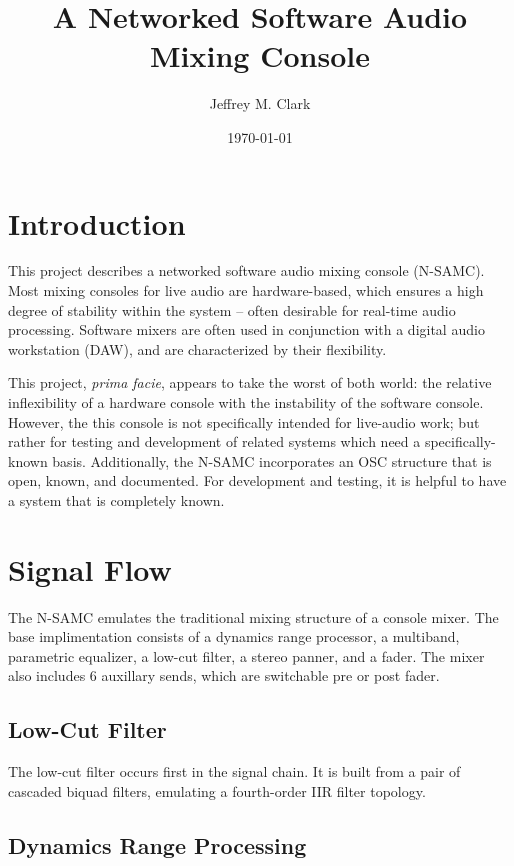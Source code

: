 \documentclass[letterpaper, 12pt, twosided, twocolumn]{article}
\title{A Networked Software Audio Mixing Console}
\author{Jeffrey M. Clark}
\date{\today}
\begin{document}
\maketitle

\section{Introduction}

This project describes a networked software audio mixing console (N-SAMC). Most mixing consoles for live audio are hardware-based, which ensures a high degree of stability within the system -- often desirable for real-time audio processing. Software mixers are often used in conjunction with a digital audio workstation (DAW), and are characterized by their flexibility.

This project, \textit{prima facie}, appears to take the worst of both world: the relative inflexibility of a hardware console with the instability of the software console. However, the this console is not specifically intended for live-audio work; but rather for testing and development of related systems which need a specifically-known basis. Additionally, the N-SAMC incorporates an OSC structure that is open, known, and documented. For development and testing, it is helpful to have a system that is completely known.

\section{Signal Flow}

The N-SAMC emulates the traditional mixing structure of a console mixer. The base implimentation consists of a dynamics range processor, a multiband, parametric equalizer, a low-cut filter, a stereo panner, and a fader. The mixer also includes 6 auxillary sends, which are switchable pre or post fader.

\subsection{Low-Cut Filter}

The low-cut filter occurs first in the signal chain. It is built from a pair of cascaded biquad filters, emulating a fourth-order IIR filter topology.

\subsection{Dynamics Range Processing}
\end{document}
